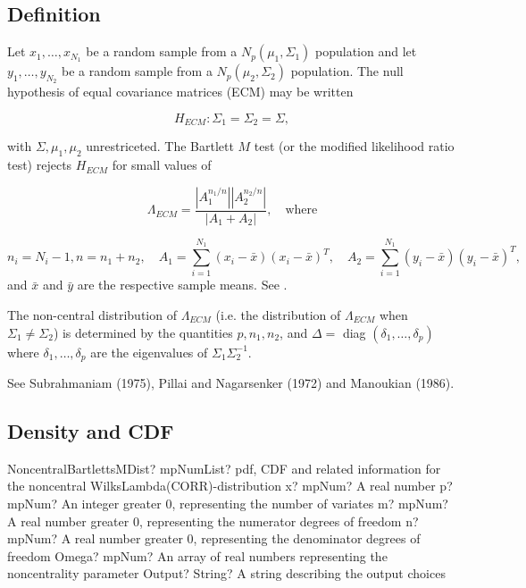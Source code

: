 \subsection{Definition}

Let $x_1,\ldots,x_{N_1}$ be a random sample from a $N_p(\mu_1, \Sigma_1)$ population and let $y_1,\ldots,y_{N_2}$ be a random sample from a $N_p(\mu_2, \Sigma_2)$ population. The null hypothesis of equal covariance matrices (ECM) may be written

\begin{equation}
	H_{ECM}: \Sigma_1 = \Sigma_2 = \Sigma,
\end{equation}

with $\Sigma, \mu_1, \mu_2$ unrestriceted.
The Bartlett $M$ test (or the modified likelihood ratio test) rejects $H_{ECM}$ for small values of

\begin{equation}
	\Lambda_{ECM} = \frac{|A_1^{n_1/n}| |A_2^{n_2/n}|}{|A_1+A_2|}, \quad \text{where}
\end{equation}

\begin{equation}
	n_i=N_i-1, n=n_1+n_2, \quad A_1 = \sum_{i=1}^{N_1}(x_i - \bar{x})(x_i - \bar{x})^T,  \quad A_2 = \sum_{i=1}^{N_1}(y_i - \bar{x})(y_i - \bar{x})^T,
\end{equation}
and $\bar{x}$ and $\bar{y}$ are the respective sample means. See  \cite{Muirhead_1982}.

The non-central distribution of $\Lambda_{ECM}$ (i.e. the distribution of $\Lambda_{ECM}$ when $\Sigma_1 \neq \Sigma_2$) is determined by the quantities $p, n_1, n_2$, and $\Delta = $ diag $(\delta_1,\ldots, \delta_p)$ where $\delta_1,\ldots, \delta_p$ are the eigenvalues of $\Sigma_1 \Sigma_2^{-1}$.


See Subrahmaniam (1975), Pillai and Nagarsenker (1972) and Manoukian (1986).

\subsection{Density and CDF}

\begin{mpFunctionsExtract}
	\mpFunctionSixNotImplemented
	{NoncentralBartlettsMDist? mpNumList? pdf, CDF and related information for the noncentral WilksLambda(CORR)-distribution}
	{x? mpNum? A real number}
	{p? mpNum? An integer greater 0, representing the number of variates}
	{m? mpNum? A real number greater 0, representing the numerator  degrees of freedom}
	{n? mpNum? A real number greater 0, representing the denominator degrees of freedom}
	{Omega? mpNum? An array of real numbers representing the noncentrality parameter}
	{Output? String? A string describing the output choices}
\end{mpFunctionsExtract}



